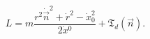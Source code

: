 \begin{equation}
L=m\frac{r^2\dot{\vec n}^2+
\dot{r}^2-\dot{x}_0^2}{2\dot{x}{}^0}+
{\mathfrak T}_d(\vec n).
\label{tphi}
\end{equation}

